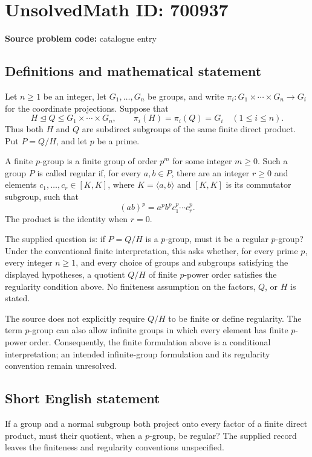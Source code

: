 \documentclass[11pt]{article}
\begin{document}
\section*{UnsolvedMath ID: 700937}
\textbf{Source problem code:} catalogue entry
\subsection{Definitions and mathematical statement}
Let \(n\geq 1\) be an integer, let \(G_1,\ldots,G_n\) be groups, and write \(\pi_i:G_1\times\cdots\times G_n\to G_i\) for the coordinate projections. Suppose that
\[
H\trianglelefteq Q\leq G_1\times\cdots\times G_n,
\qquad \pi_i(H)=\pi_i(Q)=G_i\quad(1\leq i\leq n).
\]
Thus both \(H\) and \(Q\) are subdirect subgroups of the same finite direct product. Put \(P=Q/H\), and let \(p\) be a prime.

A finite \(p\)-group is a finite group of order \(p^m\) for some integer \(m\geq 0\). Such a group \(P\) is called regular if, for every \(a,b\in P\), there are an integer \(r\geq 0\) and elements \(c_1,\ldots,c_r\in [K,K]\), where \(K=\langle a,b\rangle\) and \([K,K]\) is its commutator subgroup, such that
\[
(ab)^p=a^p b^p c_1^p\cdots c_r^p.
\]
The product is the identity when \(r=0\).

The supplied question is: if \(P=Q/H\) is a \(p\)-group, must it be a regular \(p\)-group? Under the conventional finite interpretation, this asks whether, for every prime \(p\), every integer \(n\geq 1\), and every choice of groups and subgroups satisfying the displayed hypotheses, a quotient \(Q/H\) of finite \(p\)-power order satisfies the regularity condition above. No finiteness assumption on the factors, \(Q\), or \(H\) is stated.

The source does not explicitly require \(Q/H\) to be finite or define regularity. The term \(p\)-group can also allow infinite groups in which every element has finite \(p\)-power order. Consequently, the finite formulation above is a conditional interpretation; an intended infinite-group formulation and its regularity convention remain unresolved.
\subsection{Short English statement}
If a group and a normal subgroup both project onto every factor of a finite direct product, must their quotient, when a \(p\)-group, be regular? The supplied record leaves the finiteness and regularity conventions unspecified.
\end{document}
